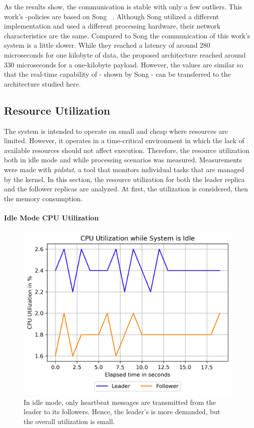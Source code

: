 As the results show, the communication is stable with only a few outliers.
This work's -policies are based on Song \etal~\cite{SongDDSInRealTimeSystems}.
Although Song \etal utilized a different  implementation and used a different processing hardware, their network characteristics are the same.
Compared to Song \etal the communication of this work's system is a little slower.
While they reached a latency of around 280 microseconds for one kilobyte of data, the proposed architecture reached around 330 microseconds for a one-kilobyte payload.
However, the values are similar so that the real-time capability of  - shown by Song \etal - can be transferred to the architecture studied here.


\subsection{Resource Utilization}

The system is intended to operate on small and cheap  where resources are limited.
However, it operates in a time-critical environment in which the lack of available resources should not affect execution.
Therefore, the resource utilization both in idle mode and while processing scenarios was measured.
Measurements were made with \textit{pidstat}, a tool that monitors individual tasks that are managed by the  kernel.
In this section, the resource utilization for both the leader replica and the follower replicas are analyzed.
At first, the  utilization is considered, then the memory consumption.

\paragraph{Idle Mode CPU Utilization}

\begin{figure}[!hbt]
	\centering
	\includegraphics[width=0.8\linewidth]{images/plots/CPUUsageIdleTime}
	\caption{In idle mode, only heartbeat messages are transmitted from the leader to its followers. Hence, the leader's  is more demanded, but the overall utilization is small.}
	\label{fig:PlotCPUUsageIdleTime}
\end{figure}


